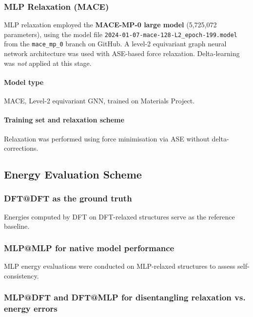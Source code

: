 \subsubsection{MLP Relaxation (MACE)}

MLP relaxation employed the \textbf{MACE-MP-0 large model} (5,725,072 parameters), using the model file \texttt{2024-01-07-mace-128-L2\_epoch-199.model} from the \texttt{mace\_mp_0} branch on GitHub. A level-2 equivariant graph neural network architecture was used with ASE-based force relaxation. Delta-learning was \emph{not} applied at this stage.

\paragraph{Model type}

MACE, Level-2 equivariant GNN, trained on Materials Project.

\paragraph{Training set and relaxation scheme}

Relaxation was performed using force minimisation via ASE without delta-corrections.


\subsection{Energy Evaluation Scheme}

\subsubsection{DFT@DFT as the ground truth}

Energies computed by DFT on DFT-relaxed structures serve as the reference baseline.

\subsubsection{MLP@MLP for native model performance}

MLP energy evaluations were conducted on MLP-relaxed structures to assess self-consistency.

\subsubsection{MLP@DFT and DFT@MLP for disentangling relaxation vs. energy errors}

